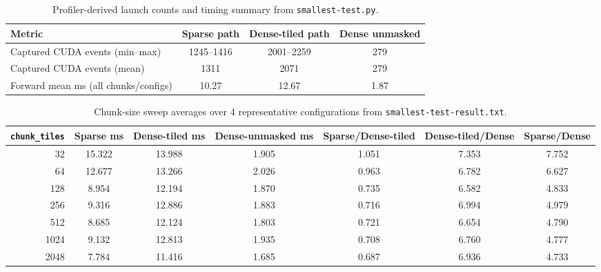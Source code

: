 \begin{table}[t]
\centering
\caption{Profiler-derived launch counts and timing summary from \texttt{smallest-test.py}.}
\label{tab:kernel-profile-summary}
\begin{tabular}{lccc}
\hline
Metric & Sparse path & Dense-tiled path & Dense unmasked \\
\hline
Captured CUDA events (min--max) & 1245--1416 & 2001--2259 & 279 \\
Captured CUDA events (mean) & 1311 & 2071 & 279 \\
Forward mean ms (all chunks/configs) & 10.27 & 12.67 & 1.87 \\
\hline
\end{tabular}
\end{table}

\begin{table}[t]
\centering
\caption{Chunk-size sweep averages over 4 representative configurations from \texttt{smallest-test-result.txt}.}
\label{tab:chunk-sweep-avg}
\begin{tabular}{rcccccc}
\hline
\texttt{chunk\_tiles} & Sparse ms & Dense-tiled ms & Dense-unmasked ms & Sparse/Dense-tiled & Dense-tiled/Dense & Sparse/Dense \\
\hline
32   & 15.322 & 13.988 & 1.905 & 1.051 & 7.353 & 7.752 \\
64   & 12.677 & 13.266 & 2.026 & 0.963 & 6.782 & 6.627 \\
128  & 8.954  & 12.194 & 1.870 & 0.735 & 6.582 & 4.833 \\
256  & 9.316  & 12.886 & 1.883 & 0.716 & 6.994 & 4.979 \\
512  & 8.685  & 12.124 & 1.803 & 0.721 & 6.654 & 4.790 \\
1024 & 9.132  & 12.813 & 1.935 & 0.708 & 6.760 & 4.777 \\
2048 & 7.784  & 11.416 & 1.685 & 0.687 & 6.936 & 4.733 \\
\hline
\end{tabular}
\end{table}

